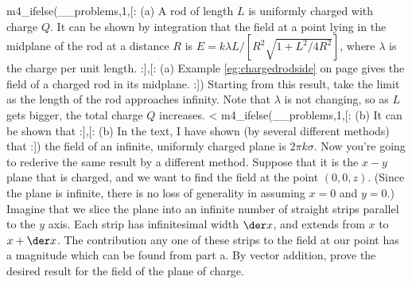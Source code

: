         m4_ifelse(__problems,1,[:%
          (a) A rod of length $L$ is uniformly charged with charge $Q$.
          It can be shown by integration that the field at a point lying in the midplane of the rod
          at a distance $R$ is  $E =  k\lambda L/\left[R^2\sqrt{1+ L^2/4 R^2}\right]$, where $\lambda$
          is the charge per unit length.
        :],[:%
          (a) Example \ref{eg:chargedrodside} on page \pageref{eg:chargedrodside}
        gives the field of a charged rod in its midplane.
        :])%
        Starting from this result, take the limit as the length of the rod approaches infinity.
        Note that $\lambda$ is not changing, so as $L$ gets bigger, the total charge $Q$ increases.
        <%
        m4_ifelse(__problems,1,[:
          (b) It can be shown that
        :],[:%
          (b) In the text, I have shown (by several different methods) that
        :])%
        the field of an infinite,
        uniformly charged plane is $2\pi k\sigma$. Now you're going to
        rederive the same result by a different method.
        Suppose that it is the $x-y$ plane that is charged, and we
        want to find the field at the point $(0,0,z)$. (Since the plane
        is infinite, there is no loss of generality in assuming
        $x=0$ and $y=0$.)
        Imagine that we slice the plane into an infinite number of
        straight strips parallel to the $y$ axis.
        Each strip has infinitesimal width $\der x$, and extends
        from $x$ to $x+\der x$. The contribution any one of these
        strips to the field at our point has a magnitude which can
        be found from part a.
        By vector addition, prove the desired result for the field of
        the plane of charge. 
